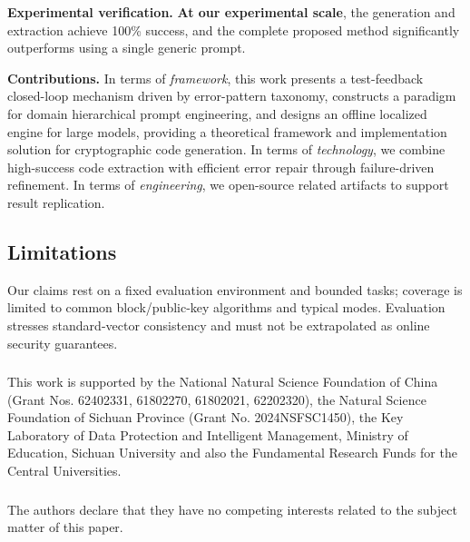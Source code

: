 \documentclass[runningheads]{llncs}
\renewcommand{\refname}{References}
\begin{document}
\textbf{Experimental verification.} \textbf{At our experimental scale}, the generation and extraction achieve 100\% success, and the complete proposed method significantly outperforms using a single generic prompt. 

\textbf{Contributions.} In terms of \emph{framework}, this work presents a test-feedback closed-loop mechanism driven by error-pattern taxonomy, constructs a paradigm for domain hierarchical prompt engineering, and designs an offline localized engine for large models, providing a theoretical framework and implementation solution for cryptographic code generation. In terms of \emph{technology}, we combine high-success code extraction with efficient error repair through failure-driven refinement. In terms of \emph{engineering}, we open-source related artifacts to support result replication.

\subsection{Limitations}
Our claims rest on a fixed evaluation environment and bounded tasks; coverage is limited to common block/public-key algorithms and typical modes. Evaluation stresses standard-vector consistency and must not be extrapolated as online security guarantees.

\begin{credits}
{\fontsize{9}{11}\selectfont
\subsubsection{\ackname}
This work is supported by the National Natural Science Foundation of China (Grant Nos. 62402331, 61802270, 61802021, 62202320), the Natural Science Foundation of Sichuan Province (Grant No. 2024NSFSC1450), the Key Laboratory of Data Protection and Intelligent Management, Ministry of Education, Sichuan University and also the Fundamental Research Funds for the Central Universities.
\subsubsection{\discintname}
The authors declare that they have no competing interests related to the subject matter of this paper.
}
\end{credits}

\renewcommand{\refname}{References}


\end{document}

